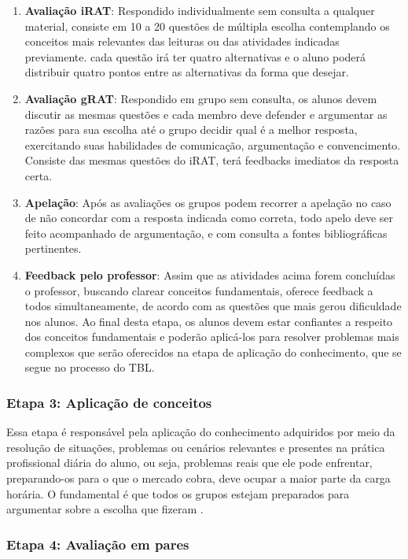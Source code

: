 \begin{enumerate}
  \item \textbf{Avaliação iRAT}: Respondido individualmente sem consulta a qualquer material, consiste em 10 a 20 questões de múltipla escolha contemplando os conceitos mais relevantes das leituras ou das atividades indicadas previamente. cada questão irá ter quatro alternativas e o aluno poderá distribuir quatro pontos entre as alternativas da forma que desejar.
  \item \textbf{Avaliação gRAT}: Respondido em grupo sem consulta, os alunos devem discutir as mesmas questões e cada membro deve defender e argumentar as razões para sua escolha até o grupo decidir qual é a melhor resposta, exercitando suas habilidades de comunicação, argumentação e convencimento. Consiste das mesmas questões do iRAT, terá feedbacks imediatos da resposta certa.
  \item \textbf{Apelação}: Após as avaliações os grupos podem recorrer a apelação no caso de não concordar com a resposta indicada como correta, todo apelo deve ser feito acompanhado de argumentação, e com consulta a fontes bibliográficas pertinentes.
  \item \textbf{Feedback pelo professor}: Assim que as atividades acima forem concluídas o professor, buscando clarear conceitos fundamentais, oferece feedback a todos simultaneamente, de acordo com as questões que mais gerou dificuldade nos alunos. Ao final desta etapa, os alunos devem estar confiantes a respeito dos conceitos fundamentais e poderão aplicá-los para resolver problemas mais complexos que serão oferecidos na etapa de aplicação do conhecimento, que se segue no processo do TBL.
\end{enumerate}

\subsubsection{Etapa 3: Aplicação de conceitos}

Essa etapa é responsável pela aplicação do conhecimento adquiridos por meio da resolução de situações, problemas ou cenários relevantes e presentes na prática profissional diária do aluno, ou seja, problemas reais que ele pode enfrentar, preparando-os para o que o mercado cobra, deve ocupar a maior parte da carga horária. O fundamental é que todos os grupos estejam preparados para argumentar sobre a escolha que fizeram \cite{sweet}.

\subsubsection{Etapa 4: Avaliação em pares}

